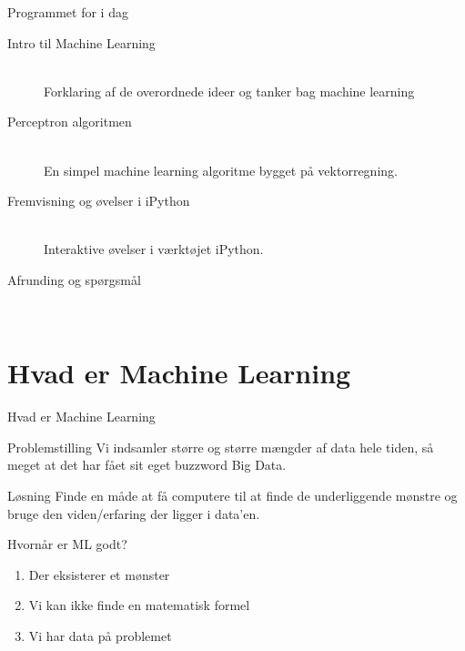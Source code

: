 \documentclass[12pt,t]{beamer}
\begin{document}
\begin{frame}[c]{Programmet for i dag}
        \begin{description}
            \item[\alert{Intro til Machine Learning}]~\\
            Forklaring af de overordnede ideer og tanker bag machine learning

            \pause
            \item[\alert{Perceptron algoritmen}]~\\
            En simpel machine learning algoritme bygget på vektorregning.

            \pause
            \item[\alert{Fremvisning og øvelser i iPython}]~\\
            Interaktive øvelser i værktøjet iPython.

            \pause
            \item[\alert{Afrunding og spørgsmål}]~\\
        \end{description}
\end{frame}

 \section{Hvad er Machine Learning}

     \begin{frame}[t]{Hvad er Machine Learning}
         \begin{block}{Problemstilling}
             Vi indsamler større og større mængder af data hele tiden, så meget
             at det har fået sit eget buzzword \alert{Big Data}. \\
         \end{block}
         \pause
         \begin{block}{Løsning}
            Finde en måde at få computere til at finde de underliggende mønstre
            og bruge den viden/erfaring der ligger i data'en.
         \end{block}
         \pause
         \begin{block}{Hvornår er ML godt?}
             \begin{enumerate}
                 \item Der eksisterer et mønster \pause
                 \item Vi kan ikke finde en matematisk formel \pause
                 \item Vi har data på problemet
             \end{enumerate}
         \end{block}
     \end{frame}
\end{document}
